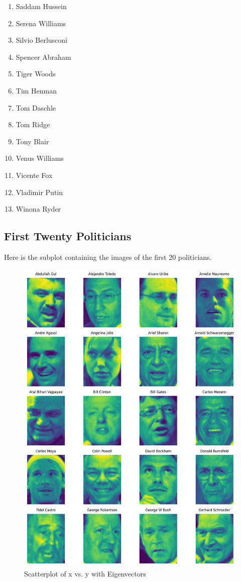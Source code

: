 \documentclass[12pt]{article}
\begin{document}
\begin{multicols}{3}
\begin{enumerate}[itemsep=0pt]
    \item Saddam Hussein
    \item Serena Williams
    \item Silvio Berlusconi
    \item Spencer Abraham
    \item Tiger Woods
    \item Tim Henman
    \item Tom Daschle
    \item Tom Ridge
    \item Tony Blair
    \item Venus Williams
    \item Vicente Fox
    \item Vladimir Putin
    \item Winona Ryder
\end{enumerate}
\end{multicols}

\subsection{First Twenty Politicians}
Here is the subplot containing the images of the first 20 politicians.

\begin{figure}[H]
    \centering
    \includegraphics[width=0.75\linewidth]{images/first_20_politicians.png}
    \caption{Scatterplot of x vs. y with Eigenvectors}
    \label{fig:scatterplot}
\end{figure}
\end{document}
